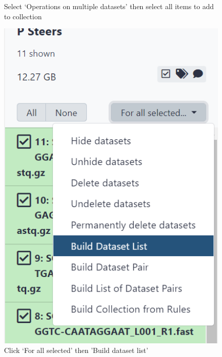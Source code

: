 \documentclass[
]{book}
\begin{document}
\begin{figure}
{}

\caption{Select ‘Operations on multiple datasets’ then select all items to add to collection}\label{fig:chunk5}
\end{figure}

\begin{figure}

{\centering \includegraphics[width=6.03in]{images/image006} 

}

\caption{Click ‘For all selected’ then 'Build dataset list'}\label{fig:chunk6}
\end{figure}
\end{document}
